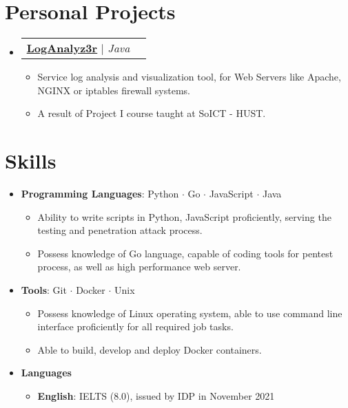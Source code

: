 \documentclass[letterpaper,10pt]{article}
\makeatletter
\newcommand{\link}[2]{\href{#1}{\color{blue}\underline{#2}}}
\newcommand{\resumeItem}[1]{
  \item\small{
    {#1 \vspace{-2pt}}
  }
}
\newcommand{\resumeProjectHeading}[2]{
  \item
  \begin{tabular*}{0.97\textwidth}{l@{\extracolsep{\fill}}r}
    \small#1 & #2 \\
  \end{tabular*}\vspace{-7pt}
}
\newcommand{\resumeSubHeadingListStart}{\begin{itemize}[leftmargin=0.15in, label={}]}
\newcommand{\resumeSubHeadingListEnd}{\end{itemize}}
\newcommand{\resumeItemListStart}{\begin{itemize}}
\newcommand{\resumeItemSubListStart}{\begin{itemize}\setlength\itemsep{0.4em}}
\newcommand{\resumeItemListEnd}{\end{itemize}\vspace{-5pt}}
\newcommand{\resumeItemSubListEnd}{\end{itemize}}
\makeatother
\begin{document}
\section{Personal Projects}
\resumeSubHeadingListStart
\resumeProjectHeading
{\link{https://github.com/teebow1e/loganalyz3r}{\textbf{LogAnalyz3r}} $|$ \emph{Java}}{}
\resumeItemListStart
\resumeItem{Service log analysis and visualization tool, for Web Servers like Apache, NGINX or iptables firewall systems.}
\resumeItem{A result of Project I course taught at SoICT - HUST.}
\resumeItemListEnd
\resumeSubHeadingListEnd


\section{Skills}
\resumeItemListStart
\resumeItem{\textbf{Programming Languages}: Python $\cdot$ Go $\cdot$ JavaScript $\cdot$ Java}
\resumeItemSubListStart
\resumeItem{Ability to write scripts in Python, JavaScript proficiently, serving the testing and penetration attack process.}
\resumeItem{Possess knowledge of Go language, capable of coding tools for pentest process, as well as high performance web server.}
\resumeItemSubListEnd

\resumeItem{\textbf{Tools}: Git $\cdot$ Docker $\cdot$ Unix}
\resumeItemSubListStart
\resumeItem{Possess knowledge of Linux operating system, able to use command line interface proficiently for all required job tasks.}
\resumeItem{Able to build, develop and deploy Docker containers.}
\resumeItemSubListEnd

\resumeItem{\textbf{Languages}}
\resumeItemSubListStart
\resumeItem{\textbf{English}: IELTS (8.0), issued by IDP in November 2021}
\resumeItemSubListEnd
\resumeItemListEnd
\end{document}
